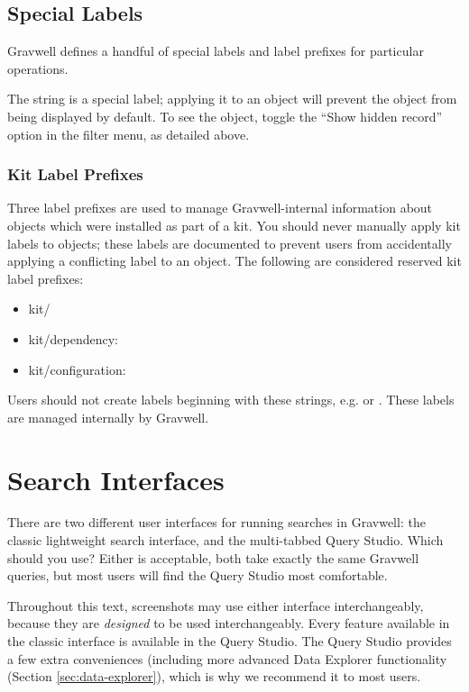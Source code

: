 \clearpage

\subsection{Special Labels}

Gravwell defines a handful of special labels and label prefixes for particular operations.

The string  is a special label; applying it to an object will prevent the object from being displayed by default. To see the object, toggle the ``Show hidden record'' option in the filter menu, as detailed above.

\subsubsection{Kit Label Prefixes}
Three label prefixes are used to manage Gravwell-internal information about objects which were installed as part of a kit. You should never manually apply kit labels to objects; these labels are documented to prevent users from accidentally applying a conflicting label to an object. The following are considered reserved kit label prefixes:


\begin{itemize}
\tightlist
\item kit/
\item kit/dependency:
\item kit/configuration:
\end{itemize}

Users should not create labels beginning with these strings, e.g.  or . These labels are managed internally by Gravwell.

\clearpage
\section{Search Interfaces}
\label{sec:search-interfaces}
There are two different user interfaces for running searches in Gravwell: the classic lightweight search interface, and the multi-tabbed Query Studio. Which should you use? Either is acceptable, both take exactly the same Gravwell queries, but most users will find the Query Studio most comfortable.

Throughout this text, screenshots may use either interface interchangeably, because they are \emph{designed} to be used interchangeably. Every feature available in the classic interface is available in the Query Studio. The Query Studio provides a few extra conveniences (including more advanced Data Explorer functionality (Section \ref{sec:data-explorer}), which is why we recommend it to most users.

